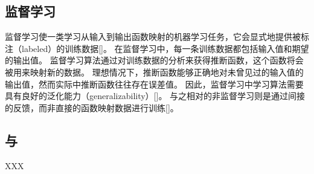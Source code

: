
\subsection{监督学习}

监督学习使一类学习从输入到输出函数映射的机器学习任务，它会显式地提供被标注（labeled）的训练数据[]。
在监督学习中，每一条训练数据都包括输入值和期望的输出值。
监督学习算法通过对训练数据的分析来获得推断函数，这个函数将会被用来映射新的数据。
理想情况下，推断函数能够正确地对未曾见过的输入值的输出值，然而实际中推断函数往往存在误差值。
因此，监督学习中学习算法需要具有良好的泛化能力（generalizability）[]。
与之相对的非监督学习则是通过间接的反馈，而非直接的函数映射数据进行{\model}训练[]。

\subsection{{\lr}与{\nn}}

XXX


